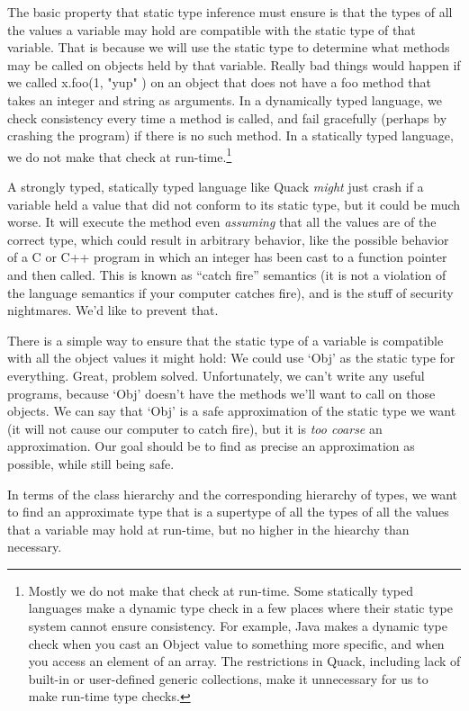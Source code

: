 \documentclass[11pt]{article}
\begin{document}
The basic property that static type inference must ensure is that the
types of all the values a variable may hold are compatible with the
static type of that variable.  That is because we will use the static
type to determine what methods may be called on objects held by that
variable.  Really bad things would happen if we called x.foo(1, "yup" ) on
an object that does not have a foo method that takes an integer and
string as arguments.  In a dynamically typed language, we check
consistency every time a method is called, and fail gracefully
(perhaps by crashing the program) if there is no such method.  In a
statically typed language, we do not make that check at
run-time.\footnote{Mostly we do not make that check at run-time.
  Some statically typed languages make a dynamic type check in a few
  places where their static type system cannot ensure consistency.
  For example, Java makes a dynamic type check when you cast an Object
  value to something more specific, and when you access an element of
  an array. The restrictions in Quack, including lack of built-in or
  user-defined generic collections, make it unnecessary for us to make
  run-time type checks.} 

A strongly typed, statically typed language like Quack \emph{might}
just crash if a variable held a value that did not conform to its
static type,  but it could be much
worse.  It will execute the method even \emph{assuming} that all the
values are of the correct type, which could result in arbitrary
behavior, like the possible behavior of a C or C++ program in which an
integer has been cast to a function pointer and then called.  This is
known as ``catch fire'' semantics (it is not a violation of the
language semantics if your computer catches fire), and is the stuff of
security nightmares.  We'd like to prevent that. 

There is a simple way to ensure that the static type of a variable is
compatible with all the object values it might hold:  We could use
`Obj' as the static type for everything.  Great, problem
solved. Unfortunately, we can't write any useful programs, because
`Obj' doesn't have the methods we'll want to call on those objects.
We can say that `Obj' is a safe approximation of the static type we
want (it will not cause our computer to catch fire), but it is
\emph{too coarse} an approximation.  Our goal should 
be to find as precise an approximation as possible, while still being
safe. 

In terms of the class hierarchy and the corresponding hierarchy of
types, we want to find an approximate type that is a supertype of all
the types of all the values that a variable may hold at run-time, but
no higher in the hiearchy than necessary.  
\end{document}

